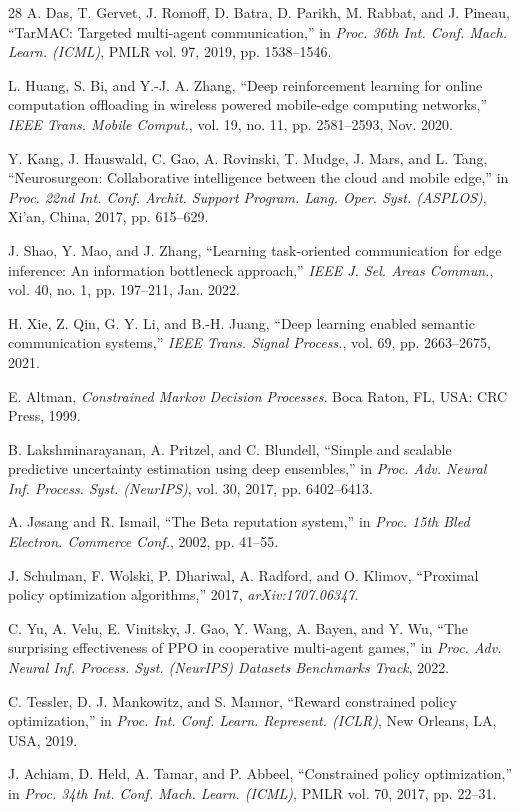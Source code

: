\documentclass[lettersize,journal]{IEEEtran}
\begin{document}
\begin{thebibliography}{28}
A. Das, T. Gervet, J. Romoff, D. Batra, D. Parikh, M. Rabbat, and J. Pineau, ``TarMAC: Targeted multi-agent communication,'' in \textit{Proc. 36th Int. Conf. Mach. Learn. (ICML)}, PMLR vol. 97, 2019, pp. 1538--1546.

L. Huang, S. Bi, and Y.-J. A. Zhang, ``Deep reinforcement learning for online computation offloading in wireless powered mobile-edge computing networks,'' \textit{IEEE Trans. Mobile Comput.}, vol. 19, no. 11, pp. 2581--2593, Nov. 2020.

Y. Kang, J. Hauswald, C. Gao, A. Rovinski, T. Mudge, J. Mars, and L. Tang, ``Neurosurgeon: Collaborative intelligence between the cloud and mobile edge,'' in \textit{Proc. 22nd Int. Conf. Archit. Support Program. Lang. Oper. Syst. (ASPLOS)}, Xi'an, China, 2017, pp. 615--629.

J. Shao, Y. Mao, and J. Zhang, ``Learning task-oriented communication for edge inference: An information bottleneck approach,'' \textit{IEEE J. Sel. Areas Commun.}, vol. 40, no. 1, pp. 197--211, Jan. 2022.

H. Xie, Z. Qin, G. Y. Li, and B.-H. Juang, ``Deep learning enabled semantic communication systems,'' \textit{IEEE Trans. Signal Process.}, vol. 69, pp. 2663--2675, 2021.

E. Altman, \textit{Constrained Markov Decision Processes}. Boca Raton, FL, USA: CRC Press, 1999.

B. Lakshminarayanan, A. Pritzel, and C. Blundell, ``Simple and scalable predictive uncertainty estimation using deep ensembles,'' in \textit{Proc. Adv. Neural Inf. Process. Syst. (NeurIPS)}, vol. 30, 2017, pp. 6402--6413.

A. J{\o}sang and R. Ismail, ``The Beta reputation system,'' in \textit{Proc. 15th Bled Electron. Commerce Conf.}, 2002, pp. 41--55.

J. Schulman, F. Wolski, P. Dhariwal, A. Radford, and O. Klimov, ``Proximal policy optimization algorithms,'' 2017, \textit{arXiv:1707.06347}.

C. Yu, A. Velu, E. Vinitsky, J. Gao, Y. Wang, A. Bayen, and Y. Wu, ``The surprising effectiveness of PPO in cooperative multi-agent games,'' in \textit{Proc. Adv. Neural Inf. Process. Syst. (NeurIPS) Datasets Benchmarks Track}, 2022.

C. Tessler, D. J. Mankowitz, and S. Mannor, ``Reward constrained policy optimization,'' in \textit{Proc. Int. Conf. Learn. Represent. (ICLR)}, New Orleans, LA, USA, 2019.

J. Achiam, D. Held, A. Tamar, and P. Abbeel, ``Constrained policy optimization,'' in \textit{Proc. 34th Int. Conf. Mach. Learn. (ICML)}, PMLR vol. 70, 2017, pp. 22--31.

\end{thebibliography}
\end{document}
